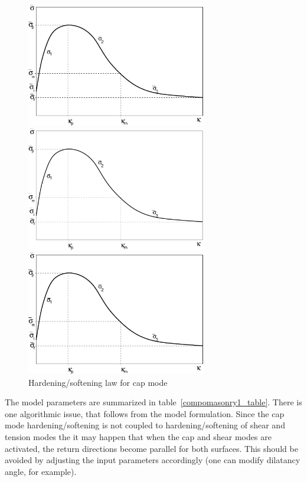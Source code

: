 \documentclass[a4paper]{article}
\begin{document}
\begin{figure}[!htb]
\begin{htmlonly}
  \centerline{\includegraphics[width=0.7\textwidth]{capmode.eps}}
\end{htmlonly}
\ifpdf
\centerline{\includegraphics[width=0.7\textwidth]{capmode.pdf}}
\else
\centerline{\includegraphics[width=0.7\textwidth]{capmode.eps}}
\fi
\caption{Hardening/softening law for cap mode}
\label{hs3fig}
\end{figure}

The model parameters are summarized in table~\ref{compomasonry1_table}.
There is one algorithmic issue, that follows from the model
formulation. Since the cap mode hardening/softening is not coupled to
hardening/softening of shear and tension modes the it may happen that
when the cap and shear modes are activated, the return directions
become parallel for both surfaces. This should be avoided by adjusting
the input parameters accordingly (one can modify dilatancy angle, for example).
\end{document}
